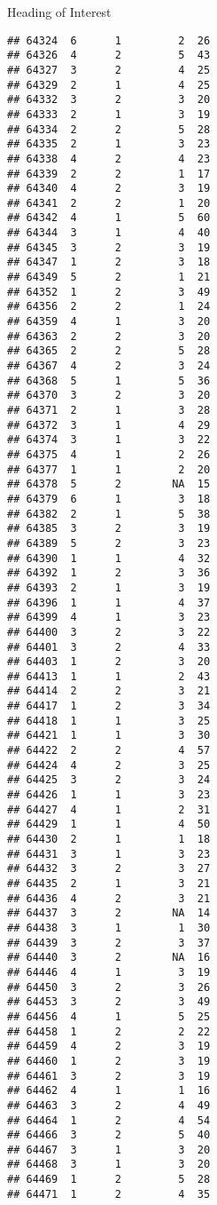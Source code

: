 \documentclass[
  ignorenonframetext,
]{beamer}
\begin{document}
\begin{frame}[fragile]{Heading of Interest}
\begin{verbatim}
## 64324  6      1         2  26
## 64326  4      2         5  43
## 64327  3      2         4  25
## 64329  2      1         4  25
## 64332  3      2         3  20
## 64333  2      1         3  19
## 64334  2      2         5  28
## 64335  2      1         3  23
## 64338  4      2         4  23
## 64339  2      2         1  17
## 64340  4      2         3  19
## 64341  2      2         1  20
## 64342  4      1         5  60
## 64344  3      1         4  40
## 64345  3      2         3  19
## 64347  1      2         3  18
## 64349  5      2         1  21
## 64352  1      2         3  49
## 64356  2      2         1  24
## 64359  4      1         3  20
## 64363  2      2         3  20
## 64365  2      2         5  28
## 64367  4      2         3  24
## 64368  5      1         5  36
## 64370  3      2         3  20
## 64371  2      1         3  28
## 64372  3      1         4  29
## 64374  3      1         3  22
## 64375  4      1         2  26
## 64377  1      1         2  20
## 64378  5      2        NA  15
## 64379  6      1         3  18
## 64382  2      1         5  38
## 64385  3      2         3  19
## 64389  5      2         3  23
## 64390  1      1         4  32
## 64392  1      2         3  36
## 64393  2      1         3  19
## 64396  1      1         4  37
## 64399  4      1         3  23
## 64400  3      2         3  22
## 64401  3      2         4  33
## 64403  1      2         3  20
## 64413  1      1         2  43
## 64414  2      2         3  21
## 64417  1      2         3  34
## 64418  1      1         3  25
## 64421  1      1         3  30
## 64422  2      2         4  57
## 64424  4      2         3  25
## 64425  3      2         3  24
## 64426  1      1         3  23
## 64427  4      1         2  31
## 64429  1      1         4  50
## 64430  2      1         1  18
## 64431  3      1         3  23
## 64432  3      2         3  27
## 64435  2      1         3  21
## 64436  4      2         3  21
## 64437  3      2        NA  14
## 64438  3      1         1  30
## 64439  3      2         3  37
## 64440  3      2        NA  16
## 64446  4      1         3  19
## 64450  3      2         3  26
## 64453  3      2         3  49
## 64456  4      1         5  25
## 64458  1      2         2  22
## 64459  4      2         3  19
## 64460  1      2         3  19
## 64461  3      2         3  19
## 64462  4      1         1  16
## 64463  3      2         4  49
## 64464  1      2         4  54
## 64466  3      2         5  40
## 64467  3      1         3  20
## 64468  3      1         3  20
## 64469  1      2         5  28
## 64471  1      2         4  35

\end{verbatim}
\end{frame}
\end{document}

